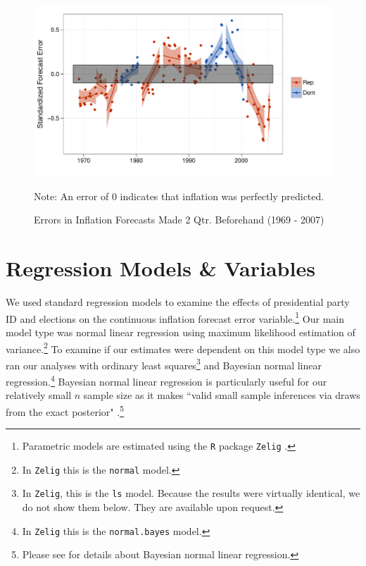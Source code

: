 \documentclass[a4paper]{article}
\begin{document}
\begin{figure}[t]
    \caption{Errors in Inflation Forecasts Made 2 Qtr. Beforehand (1969 - 2007)}
    \label{errors_over_time}
    \begin{center}

\begin{knitrout}
\color{fgcolor}

{\centering \includegraphics[width=0.8\linewidth]{figure/PartisanError} 

}



\end{knitrout}


    \end{center}
    \begin{singlespace}
        {\scriptsize{Note: An error of 0 indicates that inflation was perfectly predicted.}}
    \end{singlespace}
\end{figure}




\section{Regression Models \& Variables}

We used standard regression models to examine the effects of presidential party ID and elections on the continuous inflation forecast error variable.\footnote{Parametric models are estimated using the \texttt{R} package \texttt{Zelig} \citep{Zelig2012}.} Our main model type was normal linear regression using maximum likelihood estimation of variance.\footnote{In {\tt{Zelig}} this is the {\tt{normal}} model.} To examine if our estimates were dependent on this model type we also ran our analyses with ordinary least squares\footnote{In \texttt{Zelig}, this is the \texttt{ls} model. Because the results were virtually identical, we do not show them below. They are available upon request.} and Bayesian normal linear regression.\footnote{In {\tt{Zelig}} this is the {\tt{normal.bayes}} model.} Bayesian normal linear regression is particularly useful for our relatively small $n$ sample size as it makes ``valid small sample inferences via draws from the exact posterior" \citep[][38]{Zelig2012}.\footnote{Please see \cite{Goodrich2007} for details about Bayesian normal linear regression.}
\end{document}
